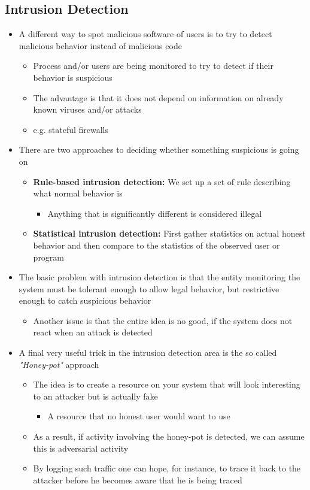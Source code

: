 \documentclass[11pt]{article}
\begin{document}
\subsection{Intrusion Detection}
\label{sec:orgd89acaf}
\begin{itemize}
\item A different way to spot malicious software of users is to try to detect malicious behavior instead of malicious code
\begin{itemize}
\item Process and/or users are being monitored to try to detect if their behavior is suspicious
\item The advantage is that it does not depend on information on already known viruses and/or attacks
\item e.g. stateful firewalls
\end{itemize}

\item There are two approaches to deciding whether something suspicious is going on
\begin{itemize}
\item \textbf{Rule-based intrusion detection:} We set up a set of rule describing what normal behavior is
\begin{itemize}
\item Anything that is significantly different is considered illegal
\end{itemize}
\item \textbf{Statistical intrusion detection:} First gather statistics on actual honest behavior and then compare to the statistics of the observed user or program
\end{itemize}

\item The basic problem with intrusion detection is that the entity monitoring the system must be tolerant enough to allow legal behavior, but restrictive enough to catch suspicious behavior
\begin{itemize}
\item Another issue is that the entire idea is no good, if the system does not react when an attack is detected
\end{itemize}

\item A final very useful trick in the intrusion detection area is the so called \emph{"Honey-pot"} approach
\begin{itemize}
\item The idea is to create a resource on your system that will look interesting to an attacker but is actually fake
\begin{itemize}
\item A resource that no honest user would want to use
\end{itemize}
\item As a result, if activity involving the honey-pot is detected, we can assume this is adversarial activity
\item By logging such traffic one can hope, for instance, to trace it back to the attacker before he becomes aware that he is being traced
\end{itemize}
\end{itemize}
\end{document}
